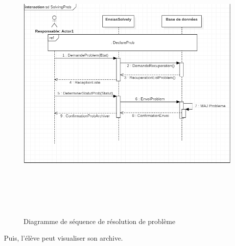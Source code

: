\documentclass[11.5pt]{report}
\begin{document}
\begin{figure}[h]
	
	\begin{center}
		\includegraphics[width=400pt,height=400pt]{seq3.png} 
		\caption{Diagramme de séquence de résolution de problème}
	\end{center}
	
\end{figure}
\newpage
Puis, l’élève peut visualiser son archive.\\
\end{document}
